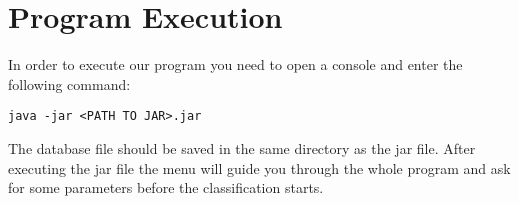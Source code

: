 \section{Program Execution}
\label{program_execution}

In order to execute our program you need to open a console and enter the following command:
\begin{center}
	\texttt{java -jar <PATH TO JAR>\ATMLProgramming.jar}
\end{center}
The database file should be saved in the same directory as the jar file.
After executing the jar file the menu will guide you through the whole program and ask for some parameters before the classification starts.